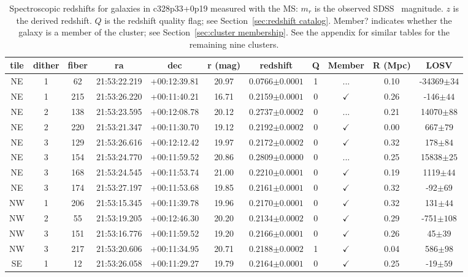 \begin{table*}
	\centering \caption{Spectroscopic redshifts for galaxies in c328p33+0p19 measured with the MS: $m_r$ is the observed SDSS \sdssr\ magnitude. $z$ is the derived redshift. $Q$ is the redshift quality flag; see Section~\ref{sec:redshift catalog}. Member? indicates whether the galaxy is a member of the cluster; see Section~\ref{sec:cluster membership}. See the appendix for similar tables for the remaining nine clusters.}
	\begin{tabular}{ccccccccccc}
		\hline
		tile & dither & fiber & ra & dec & r (mag) & redshift & Q & Member & R (Mpc) & LOSV \\
		\hline \hline
NE & 1 & 62 & 21:53:22.219 & +00:12:39.81 & 20.97 & 0.0766$\pm{0.0001}$ & 1 & ... & 0.10 & -34369$\pm{34}$ \\
NE & 1 & 215 & 21:53:26.220 & +00:11:40.21 & 16.71 & 0.2159$\pm{0.0001}$ & 0 & $\checkmark$ & 0.26 & -146$\pm{44}$ \\
NE & 2 & 138 & 21:53:23.595 & +00:12:08.78 & 20.12 & 0.2737$\pm{0.0002}$ & 0 & ... & 0.21 & 14070$\pm{88}$ \\
NE & 2 & 220 & 21:53:21.347 & +00:11:30.70 & 19.12 & 0.2192$\pm{0.0002}$ & 0 & $\checkmark$ & 0.00 & 667$\pm{79}$ \\
NE & 3 & 129 & 21:53:26.616 & +00:12:12.42 & 19.97 & 0.2172$\pm{0.0002}$ & 0 & $\checkmark$ & 0.32 & 178$\pm{84}$ \\
NE & 3 & 154 & 21:53:24.770 & +00:11:59.52 & 20.86 & 0.2809$\pm{0.0000}$ & 0 & ... & 0.25 & 15838$\pm{25}$ \\
NE & 3 & 168 & 21:53:24.545 & +00:11:53.74 & 21.00 & 0.2210$\pm{0.0001}$ & 0 & $\checkmark$ & 0.19 & 1119$\pm{44}$ \\
NE & 3 & 174 & 21:53:27.197 & +00:11:53.68 & 19.85 & 0.2161$\pm{0.0001}$ & 0 & $\checkmark$ & 0.32 & -92$\pm{69}$ \\
NW & 1 & 206 & 21:53:15.345 & +00:11:39.78 & 19.96 & 0.2170$\pm{0.0001}$ & 0 & $\checkmark$ & 0.32 & 131$\pm{44}$ \\
NW & 2 & 55 & 21:53:19.205 & +00:12:46.30 & 20.20 & 0.2134$\pm{0.0002}$ & 0 & $\checkmark$ & 0.29 & -751$\pm{108}$ \\
NW & 3 & 151 & 21:53:16.776 & +00:11:59.52 & 19.20 & 0.2166$\pm{0.0001}$ & 0 & $\checkmark$ & 0.26 & 45$\pm{39}$ \\
NW & 3 & 217 & 21:53:20.606 & +00:11:34.95 & 20.71 & 0.2188$\pm{0.0002}$ & 1 & $\checkmark$ & 0.04 & 586$\pm{98}$ \\
SE & 1 & 12 & 21:53:26.058 & +00:11:29.27 & 19.79 & 0.2164$\pm{0.0001}$ & 0 & $\checkmark$ & 0.25 & -19$\pm{59}$ \\

\end{tabular}
\end{table*}
